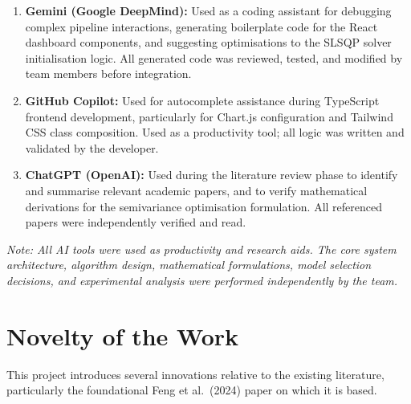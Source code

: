 \documentclass[12pt, a4paper]{article}
\begin{document}
\begin{enumerate}[leftmargin=2em, itemsep=4pt]
    \item \textbf{Gemini (Google DeepMind):} Used as a coding assistant for debugging complex pipeline interactions, generating boilerplate code for the React dashboard components, and suggesting optimisations to the SLSQP solver initialisation logic. All generated code was reviewed, tested, and modified by team members before integration.

    \item \textbf{GitHub Copilot:} Used for autocomplete assistance during TypeScript frontend development, particularly for Chart.js configuration and Tailwind CSS class composition. Used as a productivity tool; all logic was written and validated by the developer.

    \item \textbf{ChatGPT (OpenAI):} Used during the literature review phase to identify and summarise relevant academic papers, and to verify mathematical derivations for the semivariance optimisation formulation. All referenced papers were independently verified and read.
\end{enumerate}

\textit{Note: All AI tools were used as productivity and research aids. The core system architecture, algorithm design, mathematical formulations, model selection decisions, and experimental analysis were performed independently by the team.}

\section{Novelty of the Work}

This project introduces several innovations relative to the existing literature, particularly the foundational Feng et al.\ (2024) paper on which it is based.
\end{document}
